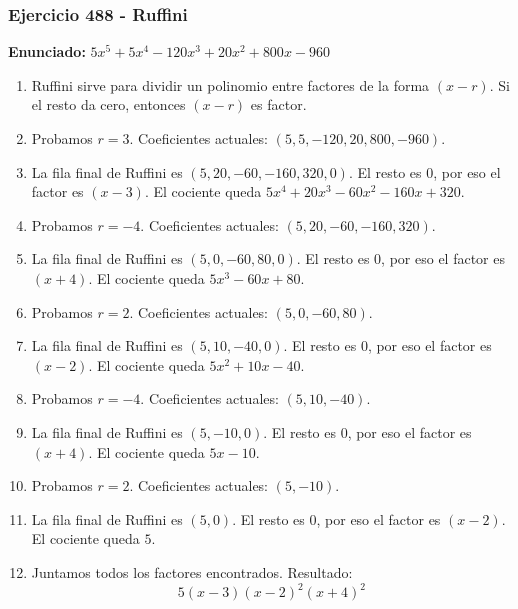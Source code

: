 \documentclass[11pt,a4paper]{article}
\begin{document}
\subsubsection*{Ejercicio 488 - Ruffini}
\textbf{Enunciado:} $ 5 x^{5} + 5 x^{4} - 120 x^{3} + 20 x^{2} + 800 x - 960 $\par
\begin{enumerate}[leftmargin=2em]
\item Ruffini sirve para dividir un polinomio entre factores de la forma \((x-r)\). Si el resto da cero, entonces \((x-r)\) es factor.
\item Probamos \(r=3\). Coeficientes actuales: \((5, 5, -120, 20, 800, -960)\).
\item La fila final de Ruffini es \((5, 20, -60, -160, 320, 0)\). El resto es \(0\), por eso el factor es \((x-3)\). El cociente queda \(5 x^{4} + 20 x^{3} - 60 x^{2} - 160 x + 320\).
\item Probamos \(r=-4\). Coeficientes actuales: \((5, 20, -60, -160, 320)\).
\item La fila final de Ruffini es \((5, 0, -60, 80, 0)\). El resto es \(0\), por eso el factor es \((x+4)\). El cociente queda \(5 x^{3} - 60 x + 80\).
\item Probamos \(r=2\). Coeficientes actuales: \((5, 0, -60, 80)\).
\item La fila final de Ruffini es \((5, 10, -40, 0)\). El resto es \(0\), por eso el factor es \((x-2)\). El cociente queda \(5 x^{2} + 10 x - 40\).
\item Probamos \(r=-4\). Coeficientes actuales: \((5, 10, -40)\).
\item La fila final de Ruffini es \((5, -10, 0)\). El resto es \(0\), por eso el factor es \((x+4)\). El cociente queda \(5 x - 10\).
\item Probamos \(r=2\). Coeficientes actuales: \((5, -10)\).
\item La fila final de Ruffini es \((5, 0)\). El resto es \(0\), por eso el factor es \((x-2)\). El cociente queda \(5\).
\item Juntamos todos los factores encontrados. Resultado: \[\boxed{5 \left(x - 3\right) \left(x - 2\right)^{2} \left(x + 4\right)^{2}}\]
\end{enumerate}

\vspace{0.2cm}
\end{document}
